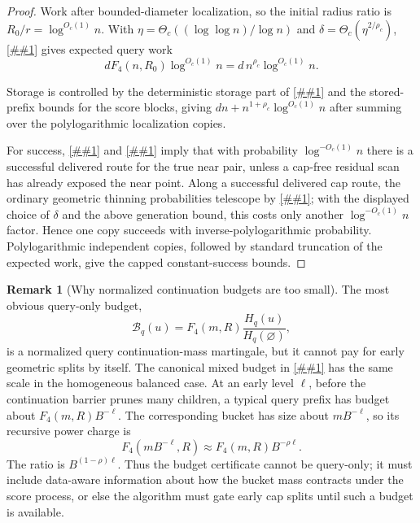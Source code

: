 \documentclass[10pt]{article}
\newcommand{\cref}[1]{\ref{##1}}
\theoremstyle{definition}
\newtheorem{remark}[theorem]{Remark}
\begin{document}
\begin{proof}
   Work after bounded-diameter localization, so the initial radius ratio is
   $R_0/r=\log^{O_c(1)}n$.  With
   \(\eta=\Theta_c((\log\log n)/\log n)\) and
   \(\delta=\Theta_c(\eta^{2/\rho_c})\),
   \cref{prop:budget-thinned-work} gives expected query work
   \[
      dF_4(n,R_0)\log^{O_c(1)}n
      =
      d\,n^{\rho_c}\log^{O_c(1)}n .
   \]

   Storage is controlled by the deterministic storage part of
   \cref{lem:thin-cap-contraction} and the stored-prefix bounds for the score
   blocks, giving $dn+n^{1+\rho_c}\log^{O_c(1)}n$ after summing over the
   polylogarithmic localization copies.

   For success, \cref{asm:aggregate-value-delivery} and
   \cref{cor:saturated-value-delivery} imply that with probability
   $\log^{-O_c(1)}n$ there is a successful delivered route for the true near pair,
   unless a cap-free residual scan has already exposed the near point. Along a
   successful delivered cap route, the ordinary geometric thinning probabilities telescope
   by \cref{lem:thin-lineage}; with the displayed choice of $\delta$ and the
   above generation bound, this costs only another $\log^{-O_c(1)}n$ factor.
   Hence one copy succeeds with inverse-polylogarithmic probability.
   Polylogarithmic independent copies, followed by standard truncation of the
   expected work, give the capped constant-success bounds.
\end{proof}

\begin{remark}[Why normalized continuation budgets are too small]\label{rem:query-only-budget}
   The most obvious query-only budget,
   \[
      \mathcal B_q(u)=F_4(m,R)\frac{H_q(u)}{H_q(\varnothing)},
   \]
   is a normalized query continuation-mass martingale, but it cannot pay for early geometric splits by itself. The canonical mixed budget in \cref{lem:canonical-mixed-budget} has the same scale in the homogeneous balanced case. At an early level $\ell$, before the continuation barrier prunes many children, a typical query prefix has budget about $F_4(m,R)B^{-\ell}$. The corresponding bucket has size about $mB^{-\ell}$, so its recursive power charge is
   \[
      F_4(mB^{-\ell},R)
      \approx
      F_4(m,R)B^{-\rho\ell}.
   \]
   The ratio is $B^{(1-\rho)\ell}$. Thus the budget certificate cannot be query-only; it must include data-aware information about how the bucket mass contracts under the score process, or else the algorithm must gate early cap splits until such a budget is available.
\end{remark}
\end{document}
